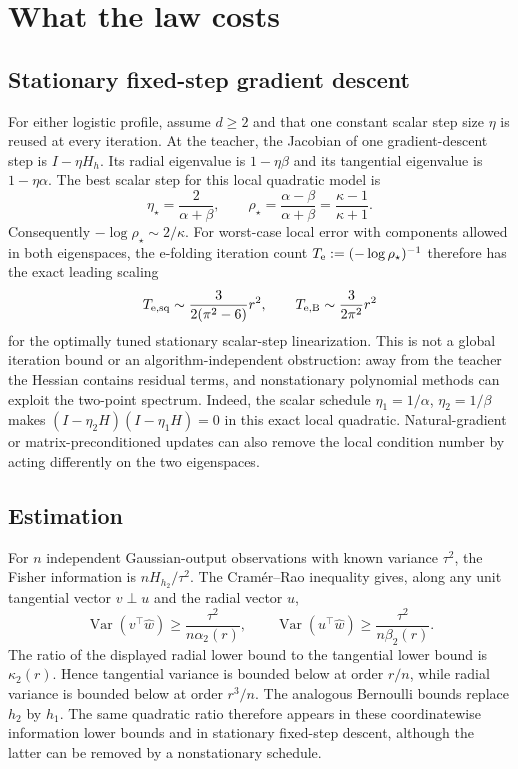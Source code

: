 \documentclass[11pt]{article}
\begin{document}
\section{What the law costs}

\subsection{Stationary fixed-step gradient descent}

For either logistic profile, assume $d\ge2$ and that one constant scalar step size $\eta$ is reused at every
iteration.  At the teacher, the
Jacobian of one gradient-descent step is $I-\eta H_h$.  Its radial eigenvalue is
$1-\eta\beta$ and its tangential eigenvalue is $1-\eta\alpha$.  The best scalar step for this local quadratic model is
\begin{equation}
 \eta_\star=\frac{2}{\alpha+\beta},\qquad
 \rho_\star=\frac{\alpha-\beta}{\alpha+\beta}=\frac{\kappa-1}{\kappa+1}.
 \label{eq:optrate}
\end{equation}
Consequently $-\log\rho_\star\sim2/\kappa$.  For worst-case local error with components allowed in both
eigenspaces, the e-folding iteration count
$T_{\rm e}:=(-\log\rho_\star)^{-1}$ therefore has the exact leading scaling
\begin{equation}
 T_{{\rm e},\rm sq}\sim\frac{3}{2(\pi^2-6)}r^2,\qquad
 T_{{\rm e},\rm B}\sim\frac3{2\pi^2}r^2
 \label{eq:iterationtax}
\end{equation}
for the optimally tuned stationary scalar-step linearization.  This is not a global iteration bound or an
algorithm-independent obstruction: away from the teacher the Hessian contains residual terms, and nonstationary
polynomial methods can exploit the two-point spectrum.  Indeed, the scalar schedule
$\eta_1=1/\alpha$, $\eta_2=1/\beta$ makes
$(I-\eta_2H)(I-\eta_1H)=0$ in this exact local quadratic.  Natural-gradient or matrix-preconditioned updates can
also remove the local condition number by acting differently on the two eigenspaces.

\subsection{Estimation}

For $n$ independent Gaussian-output observations with known variance $\tau^2$, the Fisher information is
$nH_{h_2}/\tau^2$.  The Cram\'er--Rao inequality gives, along any unit tangential vector $v\perp u$ and the radial
vector $u$,
\begin{equation}
 \operatorname{Var}(v^\top\widehat w)\ge\frac{\tau^2}{n\alpha_2(r)},\qquad
 \operatorname{Var}(u^\top\widehat w)\ge\frac{\tau^2}{n\beta_2(r)}.
 \label{eq:crgauss}
\end{equation}
The ratio of the displayed radial lower bound to the tangential lower bound is $\kappa_2(r)$.  Hence tangential
variance is bounded below at order $r/n$, while radial variance is bounded below at order
$r^3/n$.  The analogous Bernoulli bounds replace $h_2$ by $h_1$.  The same quadratic ratio therefore appears in
these coordinatewise information lower bounds and in stationary fixed-step descent, although the latter can be
removed by a nonstationary schedule.
\end{document}
